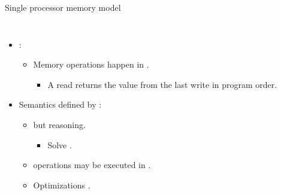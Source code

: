 \begin{frame}[t]{Single processor memory model}

\begin{columns}


\makebox[\textwidth][c]{}


\begin{itemize}
  \item {}:
    \begin{itemize}
      \item Memory operations happen in .
        \begin{itemize}
          \item A read returns the value from the last write in program order.
        \end{itemize}
    \end{itemize}
  \item Semantics defined by :
    \begin{itemize}
      \item {} but  reasoning.
        \begin{itemize}
          \item Solve .
        \end{itemize}
      \item {} operations may be executed in .
      \item Optimizations .
    \end{itemize}
\end{itemize}

\end{columns}

\end{frame}
